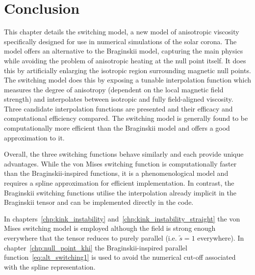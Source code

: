 \section{Conclusion}

This chapter details the switching model, a new model of anisotropic viscosity specifically designed for use in numerical simulations of the solar corona. The model offers an alternative to the Braginskii model, capturing the main physics while avoiding the problem of anisotropic heating at the null point itself. It does this by artificially enlarging the isotropic region surrounding magnetic null points. The switching model does this by exposing a tunable interpolation function which measures the degree of anisotropy (dependent on the local magnetic field strength) and interpolates between isotropic and fully field-aligned viscosity. Three candidate interpolation functions are presented and their efficacy and computational efficiency compared. The switching model is generally found to be computationally more efficient than the Braginskii model and offers a good approximation to it.

Overall, the three switching functions behave similarly and each provide unique advantages. While the von Mises switching function is computationally faster than the Braginskii-inspired functions, it is a phenomenological model and requires a spline approximation for efficient implementation. In contrast, the Braginskii switching functions utilise the interpolation already implicit in the Braginskii tensor and can be implemented directly in the code. 

In chapters~\ref{chp:kink_instability} and~\ref{chp:kink_instability_straight} the von Mises switching model is employed although the field is strong enough everywhere that the tensor reduces to purely parallel (i.e. $\tilde{s} = 1$ everywhere). In chapter~\ref{chp:null_point_khi} the Braginskii-inspired parallel function~\eqref{eq:alt_switching1} is used to avoid the numerical cut-off associated with the spline representation.

